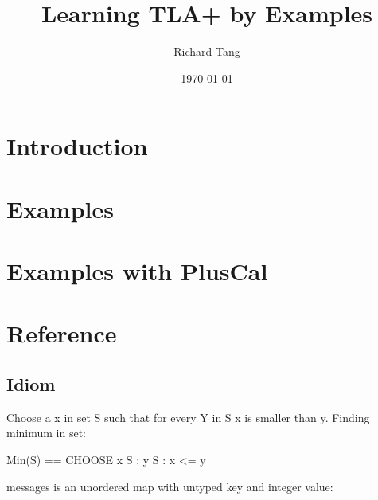 \documentclass{report}
\title{Learning TLA+ by Examples}
\author{Richard Tang}
\date{\today}
\begin{document}
\maketitle
\tableofcontents

\part{Introduction}





\part{Examples}











\part{Examples with PlusCal}





\part{Reference}



\chapter{Idiom}

Choose a x in set S such that for every Y in S x is smaller than y.
Finding minimum in set:\newline
\begin{tla}
    Min(S) == CHOOSE x \in S : \A y \in S : x <= y
\end{tla}
\begin{tlatex}
\end{tlatex}
\newline

messages is an unordered map with untyped key and integer value:\newline
\end{document}
